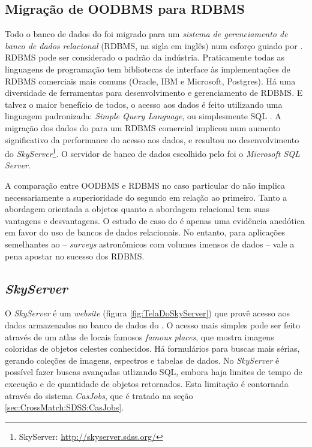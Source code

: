 \subsection{Migração de OODBMS para RDBMS}
Todo o banco de dados do \SDSS foi migrado para um {\em sistema de gerenciamento
de banco de dados relacional} \citep{Codd1970} (RDBMS, na sigla em inglês) num
esforço guiado por \citet{Thakar2004}. RDBMS pode ser considerado o padrão da
indústria. Praticamente todas as linguagens de programação tem bibliotecas de
interface às implementações de RDBMS comerciais mais comuns (Oracle, IBM e
Microsoft, Postgres). Há uma diversidade de ferramentas para desenvolvimento e
gerenciamento de RDBMS. E talvez o maior benefício de todos, o acesso aos dados
é feito utilizando uma linguagem padronizada: {\em Simple Query Language}, ou
simplesmente SQL \citep{Chamberlin1974}. A migração dos dados do \SDSS para um
RDBMS comercial implicou num aumento significativo da performance do acesso aos
dados, e resultou no desenvolvimento do {\em SkyServer}\footnote{SkyServer:
\url{http://skyserver.sdss.org/}}. O servidor de banco de dados escolhido pelo
\SDSS foi o {\em Microsoft SQL Server}.

A comparação entre OODBMS e RDBMS no caso particular do \SDSS não implica
necessariamente a superioridade do segundo em relação ao primeiro. Tanto a
abordagem orientada a objetos quanto a abordagem relacional tem suas vantagens e
desvantagens. O estudo de caso do \SDSS é apenas uma evidência anedótica em
favor do uso de bancos de dados relacionais. No entanto, para aplicações
semelhantes ao \SDSS -- {\em surveys} astronômicos com volumes imensos de dados
-- vale a pena apostar no sucesso dos RDBMS.

\subsection{{\em SkyServer}}
\label{sec:CrossMatch:SDSS:SkyServer}
O {\em SkyServer} é um {\em website} (figura \ref{fig:TelaDoSkyServer}) que
provê acesso aos dados armazenados no banco de dados do \SDSS
\citep{Szalay2002}. O acesso mais simples pode ser feito através de um atlas de
locais famosos {\em famous places}, que mostra imagens coloridas de objetos
celestes conhecidos. Há formulários para buscas mais sérias, gerando coleções de
imagens, espectros e tabelas de dados. No {\em SkyServer} é possível fazer
buscas avançadas utlizando SQL, embora haja limites de tempo de execução e de
quantidade de objetos retornados. Esta limitação é contornada através do sistema
{\em CasJobs}, que é tratado na seção \ref{sec:CrossMatch:SDSS:CasJobs}.

